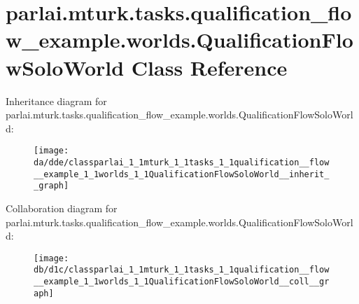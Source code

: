 \hypertarget{classparlai_1_1mturk_1_1tasks_1_1qualification__flow__example_1_1worlds_1_1QualificationFlowSoloWorld}{}\section{parlai.\+mturk.\+tasks.\+qualification\+\_\+flow\+\_\+example.\+worlds.\+Qualification\+Flow\+Solo\+World Class Reference}
\label{classparlai_1_1mturk_1_1tasks_1_1qualification__flow__example_1_1worlds_1_1QualificationFlowSoloWorld}


Inheritance diagram for parlai.\+mturk.\+tasks.\+qualification\+\_\+flow\+\_\+example.\+worlds.\+Qualification\+Flow\+Solo\+World\+:
\nopagebreak
\begin{figure}[H]
\begin{center}
\leavevmode
\texttt{[image: da/dde/classparlai\_1\_1mturk\_1\_1tasks\_1\_1qualification\_\_flow\_\_example\_1\_1worlds\_1\_1QualificationFlowSoloWorld\_\_inherit\_\_graph]}
\end{center}
\end{figure}


Collaboration diagram for parlai.\+mturk.\+tasks.\+qualification\+\_\+flow\+\_\+example.\+worlds.\+Qualification\+Flow\+Solo\+World\+:
\nopagebreak
\begin{figure}[H]
\begin{center}
\leavevmode
\texttt{[image: db/d1c/classparlai\_1\_1mturk\_1\_1tasks\_1\_1qualification\_\_flow\_\_example\_1\_1worlds\_1\_1QualificationFlowSoloWorld\_\_coll\_\_graph]}
\end{center}
\end{figure}
